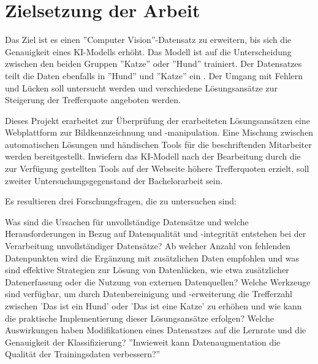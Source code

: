 \section{Zielsetzung der Arbeit}\label{sec:introduction-objectives}
Das Ziel ist es einen ''Computer Vision''-Datensatz zu erweitern, bis sich die Genauigkeit eines KI-Modells erhöht. Das Modell ist auf die Unterscheidung zwischen den beiden Gruppen ''Katze'' oder ''Hund'' trainiert.  Der Datensatzes teilt die Daten ebenfalls in ''Hund'' und ''Katze'' ein . Der Umgang mit Fehlern und Lücken soll untersucht werden und verschiedene Lösungsansätze zur Steigerung der Trefferquote angeboten werden. 

Dieses Projekt erarbeitet zur Überprüfung der erarbeiteten Lösungsansätzen eine Webplattform zur Bildkennzeichnung und -manipulation. Eine Mischung zwischen automatischen Lösungen und händischen Tools für die beschriftenden Mitarbeiter werden bereitgestellt. Inwiefern das KI-Modell nach der Bearbeitung durch die zur Verfügung gestellten Tools auf der Webseite höhere Trefferquoten erzielt, soll zweiter Untersuchungsgegenstand der Bachelorarbeit sein.

 Es resultieren drei Forschungsfragen, die zu untersuchen sind:

   Was sind die Ursachen für unvollständige Datensätze und welche Herausforderungen in Bezug auf Datenqualität und -integrität entstehen bei der Verarbeitung unvollständiger Datensätze?
   Ab welcher Anzahl von fehlenden Datenpunkten wird die Ergänzung mit zusätzlichen Daten empfohlen und was sind effektive Strategien zur Lösung von Datenlücken, wie etwa zusätzlicher Datenerfassung oder die Nutzung von externen Datenquellen? 
   Welche Werkzeuge sind verfügbar, um durch Datenbereinigung und -erweiterung die Trefferzahl zwischen 'Das ist ein Hund' oder 'Das ist eine Katze' zu erhöhen und wie kann die praktische Implementierung dieser Lösungsansätze erfolgen?
   Welche Auswirkungen haben Modifikationen eines Datensatzes auf die Lernrate und die Genauigkeit der Klassifizierung?
   ''Inwieweit kann Datenaugmentation die Qualität der Trainingsdaten verbessern?''

